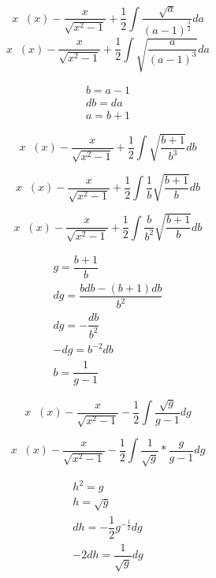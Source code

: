 \documentclass[12pt]{article}
\DeclareMathOperator{\seci}{sec^{-1}}
\begin{document}
\begin{center}
\begin{equation}
x\seci(x) -
\dfrac{x}{\sqrt{x^2 -1}}
+ \frac{1}{2}\int{\dfrac{\sqrt{a}}{(a-1)^\frac{3}{2}}} da
\end{equation}
\begin{equation}
x\seci(x) -
\dfrac{x}{\sqrt{x^2 -1}}
+ \frac{1}{2}\int{\sqrt{\dfrac{a}{(a-1)^3}}} da
\end{equation}

\begin{gather}
b=a-1\\
db=da\\
a=b+1
\end{gather}

\begin{equation}
x\seci(x) -
\dfrac{x}{\sqrt{x^2 -1}}
+ \frac{1}{2}\int{\sqrt{\dfrac{b+1}{b^3}}} db
\end{equation}

\begin{equation}
x\seci(x) -
\dfrac{x}{\sqrt{x^2 -1}}
+ \frac{1}{2}\int{\dfrac{1}{b}\sqrt{\dfrac{b+1}{b}}} db
\end{equation}

\begin{equation}
x\seci(x) -
\dfrac{x}{\sqrt{x^2 -1}}
+ \frac{1}{2}\int{\dfrac{b}{b^2}\sqrt{\dfrac{b+1}{b}}} db
\end{equation}

\begin{gather}
g=\dfrac{b+1}{b}\\
dg=\dfrac{bdb-(b+1)db}{b^2}\\
dg=-\dfrac{db}{b^2}\\
-dg=b^{-2} db\\
b=\dfrac{1}{g-1}
\end{gather}

\begin{equation}
x\seci(x) -
\dfrac{x}{\sqrt{x^2 -1}}
- \frac{1}{2}\int{\dfrac{\sqrt{g}}{g-1}} dg
\end{equation}

\begin{equation}
x\seci(x) -
\dfrac{x}{\sqrt{x^2 -1}}
- \frac{1}{2}\int{\dfrac{1}{\sqrt{g}}*\dfrac{g}{g-1}} dg
\end{equation}

\begin{gather}
h^2 = g\\
h = \sqrt{g}\\
dh = -\dfrac{1}{2} g^{-\frac{1}{2}} dg\\
-2dh = \dfrac{1}{\sqrt{g}} dg
\end{gather}


\end{center}
\end{document}
